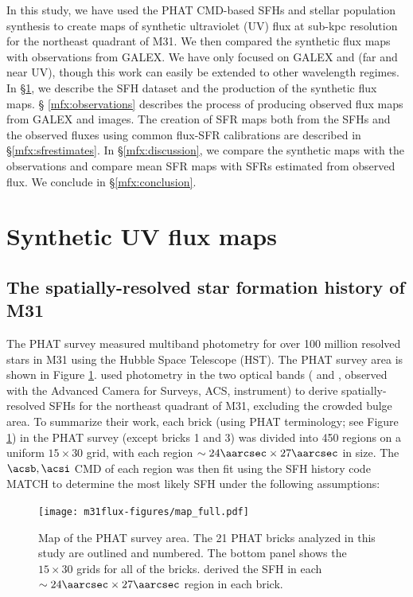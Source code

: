 In this study, we have used the PHAT CMD-based SFHs and stellar population
synthesis to create maps of synthetic ultraviolet (UV) flux at sub-kpc
resolution for the northeast quadrant of M31. We then compared the synthetic
flux maps with observations from GALEX. We have only focused on GALEX \fuv{}
and \nuv{} (far and near UV), though this work can easily be extended to other
wavelength regimes. In \S \ref{mfx:syntheticfluxmaps}, we describe the SFH
dataset and the production of the synthetic flux maps. \S
\ref{mfx:observations} describes the process of producing observed flux maps
from GALEX \fuv{} and \nuv{} images. The creation of SFR maps both from the
SFHs and the observed fluxes using common flux-SFR calibrations are described
in \S \ref{mfx:sfrestimates}. In \S \ref{mfx:discussion}, we compare the
synthetic maps with the observations and compare mean SFR maps with SFRs
estimated from observed flux. We conclude in \S \ref{mfx:conclusion}.





\section{Synthetic UV flux maps}\label{mfx:syntheticfluxmaps}



\subsection{The spatially-resolved star formation history of M31}

The PHAT survey \citep{Dalcanton:2012} measured multiband photometry for over
100 million resolved stars in M31 using the Hubble Space Telescope (HST). The
PHAT survey area is shown in Figure \ref{fig:mfx:dummy1}. \citet{Lewis:2014}
used photometry in the two optical bands (\acsb{} and \acsi{}, observed with
the Advanced Camera for Surveys, ACS, instrument) to derive spatially-resolved
SFHs for the northeast quadrant of M31, excluding the crowded bulge area. To
summarize their work, each brick (using PHAT terminology; see Figure
\ref{fig:mfx:dummy1}) in the PHAT survey (except bricks 1 and 3) was divided
into 450 regions on a uniform $15 \times 30$ grid, with each region $\sim
24\aarcsec \times 27\aarcsec$ in size. The $\acsb,\acsi$ CMD of each region was
then fit using the SFH history code MATCH \citep{Dolphin:2002} to determine the
most likely SFH under the following assumptions:


\begin{figure}
\centering
\texttt{[image: m31flux-figures/map\_full.pdf]}
\caption[PHAT survey map.]{Map of the PHAT survey area. The 21 PHAT bricks
    analyzed in this study are outlined and numbered. The bottom panel shows
    the $15 \times 30$ grids for all of the bricks. \citet{Lewis:2014} derived
    the SFH in each $\sim 24\aarcsec \times 27\aarcsec$ region in each brick.
}
\label{fig:mfx:dummy1}
\end{figure}


